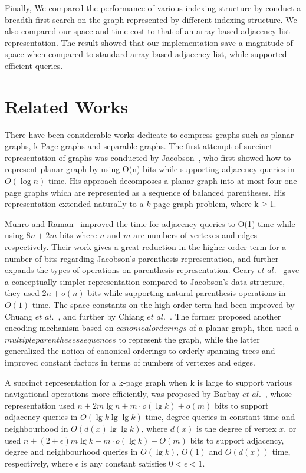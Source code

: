 \documentclass[12pt,glossary]{dalthesis}
\begin{document}
\bigskip
\bigskip

Finally, We compared the performance of various indexing structure by conduct a breadth-first-search on the graph represented by different indexing structure. We also compared our space and time cost to that of an array-based adjacency list representation. The result showed that our implementation save a magnitude of space when compared to standard array-based adjacency list, while supported efficient queries.   

\section{Related Works}

There have been considerable works dedicate to compress graphs such as planar graphs, k-Page graphs and separable graphs. The first attempt of succinct representation of graphs was conducted by Jacobson~\cite{Jacobson}, who first showed how to represent planar graph by using O(n) bits while supporting adjacency queries in $O(\log n)$ time. His approach decomposes a planar graph into at most four one-page graphs which are represented as a sequence of balanced parentheses. His representation extended naturally to a $k$-page graph problem, where k$\geq$1.

\bigskip
\bigskip

Munro and Raman~\cite{Munro} improved the time for adjacency queries to O(1) time while using $8n+2m$ bits where $n$ and $m$ are numbers of vertexes and edges respectively. Their work gives a great reduction in the higher order term for a number of bits regarding Jacobson's parenthesis representation, and further expands the types of operations on parenthesis representation. Geary $et$ $al.$~\cite{Geary} gave a conceptually simpler representation compared to Jacobson's data structure, they used $2n+o(n)$ bits while supporting natural parenthesis operations in $O(1)$ time. The space constants on the high order term had been improved by Chuang $et$ $al.$~\cite{Chuang}, and further by Chiang $et$ $al.$~\cite{Chiang}. The former proposed another encoding mechanism based on $canonical orderings$ of a planar graph, then used a $multiple parentheses sequences$ to represent the graph, while the latter generalized the notion of canonical orderings to orderly spanning trees and improved constant factors in terms of numbers of vertexes and edges. 

\bigskip
\bigskip

A succinct representation for a k-page graph when k is large to support various navigational
operations more efficiently, was proposed by Barbay $et$ $al.$~\cite{Barbay}, whose representation used $n+2m\lg n + m \cdot o(\lg k) + o(m)$ bits to support adjacency queries in $O(\lg k \lg \lg k)$ time, degree queries in constant time and neighbourhood in $O(d(x) \lg \lg k)$, where $d(x)$ is the degree of vertex $x$, or used $n+(2+\epsilon)m\lg k + m \cdot o(\lg k) + O(m)$ bits to support adjacency, degree and neighbourhood queries in $O(\lg k)$, $O(1)$ and $O(d(x))$ time, respectively, where $\epsilon$ is any constant satisfies $0< \epsilon <1$.   
\end{document}
